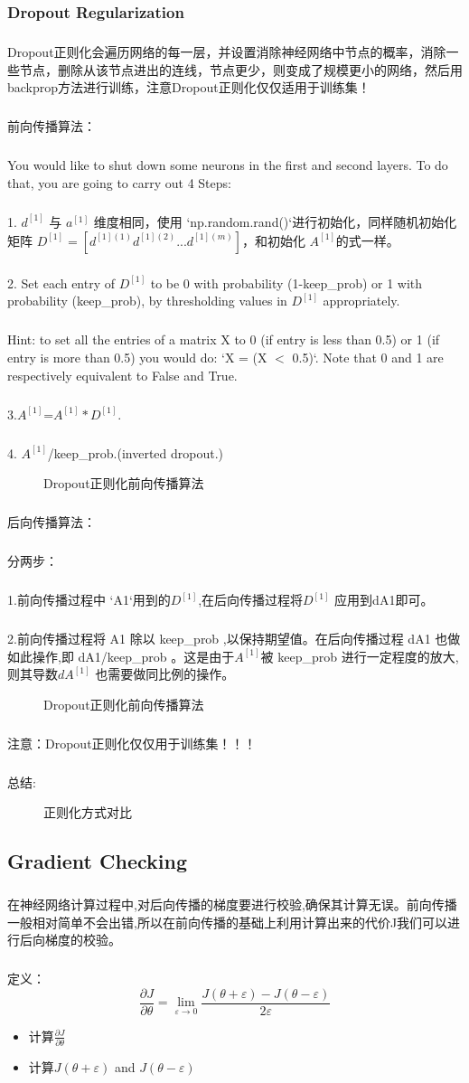 \documentclass{article}
\begin{document}
\begin{CJK}{UTF8}{gbsn}
\subsubsection{Dropout Regularization}
\subparagraph{}
Dropout正则化会遍历网络的每一层，并设置消除神经网络中节点的概率，消除一些节点，删除从该节点进出的连线，节点更少，则变成了规模更小的网络，然后用backprop方法进行训练，注意Dropout正则化仅仅适用于训练集！
\subparagraph{}
前向传播算法：
\subparagraph{}
You would like to shut down some neurons in the first and second layers. To do that, you are going to carry out 4 Steps:
\subparagraph{}
1. $d^{[1]}$ 与 $a^{[1]}$ 维度相同，使用 `np.random.rand()`进行初始化，同样随机初始化矩阵 $D^{[1]} = [d^{[1](1)} d^{[1](2)} ... d^{[1](m)}] $，和初始化 $A^{[1]}$的式一样。
\subparagraph{}
2. Set each entry of $D^{[1]}$ to be 0 with probability (1-keep\_{}prob) or 1 with probability (keep\_{}prob), by thresholding values in $D^{[1]}$ appropriately.
\subparagraph{}
Hint: to set all the entries of a matrix X to 0 (if entry is less than 0.5) or 1 (if entry is more than 0.5) you would do: `X = (X $<$ 0.5)`. Note that 0 and 1 are respectively equivalent to False and True.
\subparagraph{}
3.$A^{[1]}$=$A^{[1]} * D^{[1]}$. 
\subparagraph{}
4. $A^{[1]}$/keep\_{}prob.(inverted dropout.)
\begin{figure}[H]
\label{fig:23}
\caption{Dropout正则化前向传播算法}
\end{figure}
\subparagraph{}
后向传播算法：
\subparagraph{}
分两步：
\subparagraph{}
1.前向传播过程中 `A1`用到的$D^{[1]}$,在后向传播过程将$D^{[1]}$ 应用到dA1即可。 
\subparagraph{}
2.前向传播过程将 A1 除以 keep\_{}prob ,以保持期望值。在后向传播过程 dA1 也做如此操作,即 dA1/keep\_{}prob 。这是由于$A^{[1]}$被 keep\_{}prob 进行一定程度的放大,则其导数$dA^{[1]}$ 也需要做同比例的操作。
\begin{figure}[H]
\label{fig:24}
\caption{Dropout正则化前向传播算法}
\end{figure}
\subparagraph{}
注意：Dropout正则化仅仅用于训练集！！！
\subparagraph{}
总结:
\begin{figure}[H]
\label{fig:25}
\caption{正则化方式对比}
\end{figure}
\subsection{Gradient Checking}
\subparagraph{}
在神经网络计算过程中,对后向传播的梯度要进行校验,确保其计算无误。前向传播一般相对简单不会出错,所以在前向传播的基础上利用计算出来的代价J我们可以进行后向梯度的校验。
\subparagraph{}
定义：
\begin{equation}
\frac{\partial J}{\partial \theta} = \lim_{\varepsilon \to 0} \frac{J(\theta + \varepsilon) - J(\theta - \varepsilon)}{2 \varepsilon} \tag{1}
\end{equation}
\begin{itemize}
\item 计算$\frac{\partial J}{\partial \theta}$ 
\item 计算$J(\theta + \varepsilon)$ and $J(\theta - \varepsilon)$ 
\end{itemize}

\end{CJK}
\end{document}
